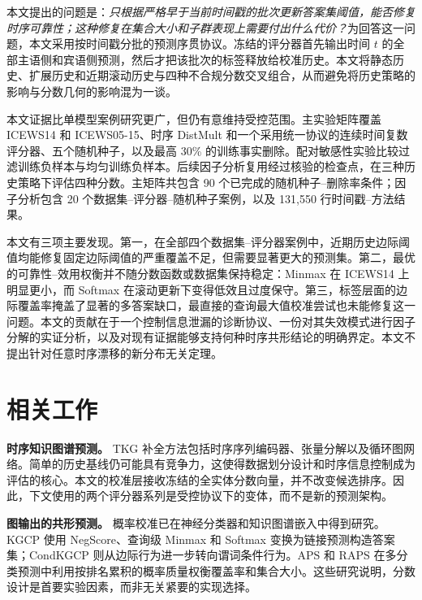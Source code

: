 \documentclass[UTF8,a4paper,11pt]{ctexart}
\begin{document}
本文提出的问题是：\emph{只根据严格早于当前时间戳的批次更新答案集阈值，能否修复时序可靠性；这种修复在集合大小和子群表现上需要付出什么代价？}为回答这一问题，本文采用按时间戳分批的预测序贯协议。冻结的评分器首先输出时间 \(t\) 的全部主语侧和宾语侧预测，然后才把该批次的标签释放给校准历史。本文将静态历史、扩展历史和近期滚动历史与四种不合规分数交叉组合，从而避免将历史策略的影响与分数几何的影响混为一谈。

本文证据比单模型案例研究更广，但仍有意维持受控范围。主实验矩阵覆盖 ICEWS14 和 ICEWS05-15、时序 DistMult 和一个采用统一协议的连续时间复数评分器、五个随机种子，以及最高 30\% 的训练事实删除。配对敏感性实验比较过滤训练负样本与均匀训练负样本。后续因子分析复用经过核验的检查点，在三种历史策略下评估四种分数。主矩阵共包含 90 个已完成的随机种子--删除率条件；因子分析包含 20 个数据集--评分器--随机种子案例，以及 131,550 行时间戳--方法结果。

本文有三项主要发现。第一，在全部四个数据集--评分器案例中，近期历史边际阈值均能修复固定边际阈值的严重覆盖不足，但需要显著更大的预测集。第二，最优的可靠性--效用权衡并不随分数函数或数据集保持稳定：Minmax 在 ICEWS14 上明显更小，而 Softmax 在滚动更新下变得低效且过度保守。第三，标签层面的边际覆盖率掩盖了显著的多答案缺口，最直接的查询最大值校准尝试也未能修复这一问题。本文的贡献在于一个控制信息泄漏的诊断协议、一份对其失效模式进行因子分解的实证分析，以及对现有证据能够支持何种时序共形结论的明确界定。本文不提出针对任意时序漂移的新分布无关定理。

\section{相关工作}

\textbf{时序知识图谱预测。}
TKG 补全方法包括时序序列编码器、张量分解以及循环图网络\cite{garciaduran2018sequence,lacroix2020tcomplex,li2021regcn,li2022tirgn}。简单的历史基线仍可能具有竞争力，这使得数据划分设计和时序信息控制成为评估的核心\cite{gastinger2024repeat,gastinger2024tgb2}。本文的校准层接收冻结的全实体分数向量，并不改变候选排序。因此，下文使用的两个评分器系列是受控协议下的变体，而不是新的预测架构。

\textbf{图输出的共形预测。}
概率校准已在神经分类器和知识图谱嵌入中得到研究\cite{guo2017calibration,safavi2020calibration}。KGCP 使用 NegScore、查询级 Minmax 和 Softmax 变换为链接预测构造答案集\cite{zhu2025kgcp}；CondKGCP 则从边际行为进一步转向谓词条件行为\cite{zhu2025condkgcp}。APS 和 RAPS 在多分类预测中利用按排名累积的概率质量权衡覆盖率和集合大小\cite{angelopoulos2021raps}。这些研究说明，分数设计是首要实验因素，而非无关紧要的实现选择。
\end{document}
